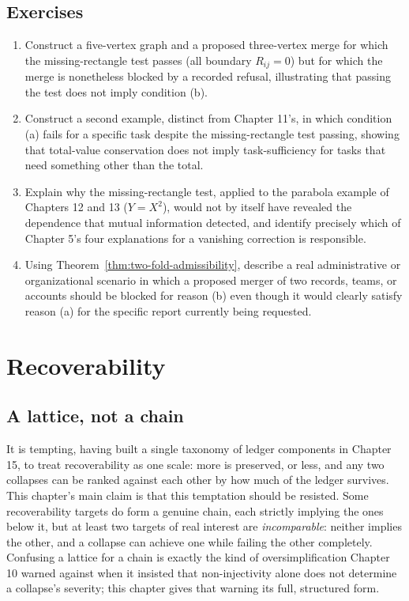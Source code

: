 \documentclass[11pt]{book}
\begin{document}
\section*{Exercises}
\begin{enumerate}
\item Construct a five-vertex graph and a proposed three-vertex merge for which the missing-rectangle test passes (all boundary $R_{ij}=0$) but for which the merge is nonetheless blocked by a recorded refusal, illustrating that passing the test does not imply condition (b).
\item Construct a second example, distinct from Chapter 11's, in which condition (a) fails for a specific task despite the missing-rectangle test passing, showing that total-value conservation does not imply task-sufficiency for tasks that need something other than the total.
\item Explain why the missing-rectangle test, applied to the parabola example of Chapters 12 and 13 ($Y=X^2$), would not by itself have revealed the dependence that mutual information detected, and identify precisely which of Chapter 5's four explanations for a vanishing correction is responsible.
\item Using Theorem~\ref{thm:two-fold-admissibility}, describe a real administrative or organizational scenario in which a proposed merger of two records, teams, or accounts should be blocked for reason (b) even though it would clearly satisfy reason (a) for the specific report currently being requested.
\end{enumerate}

\chapter{Recoverability}

\section{A lattice, not a chain}

It is tempting, having built a single taxonomy of ledger components in Chapter 15, to treat recoverability as one scale: more is preserved, or less, and any two collapses can be ranked against each other by how much of the ledger survives. This chapter's main claim is that this temptation should be resisted. Some recoverability targets do form a genuine chain, each strictly implying the ones below it, but at least two targets of real interest are \emph{incomparable}: neither implies the other, and a collapse can achieve one while failing the other completely. Confusing a lattice for a chain is exactly the kind of oversimplification Chapter 10 warned against when it insisted that non-injectivity alone does not determine a collapse's severity; this chapter gives that warning its full, structured form.
\end{document}
